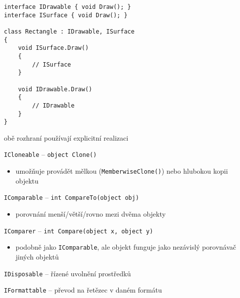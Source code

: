 \begin{frame}[fragile]
\begin{yesblock}
\begin{lstlisting}
interface IDrawable { void Draw(); }
interface ISurface { void Draw(); }

class Rectangle : IDrawable, ISurface
{
    void ISurface.Draw()
    {
        // ISurface
    }

    void IDrawable.Draw()
    {
        // IDrawable
    }
}
\end{lstlisting}
\end{yesblock}
\vfill
\begin{bitemize}{}
\item obě rozhraní používají explicitní realizaci
\end{bitemize}
\end{frame}










\begin{frame}[fragile]
\vfill
\begin{bitemize}{}
\item \lstinline|ICloneable| -- \lstinline|object Clone()|
\begin{itemize}
\item umožňuje provádět mělkou (\lstinline|MemberwiseClone()|) nebo hlubokou kopii objektu
\end{itemize}

\item \lstinline|IComparable| -- \lstinline|int CompareTo(object obj)|
\begin{itemize}
\item porovnání menší/větší/rovno mezi dvěma objekty
\end{itemize}

\item \lstinline|IComparer| -- \lstinline|int Compare(object x, object y)|
\begin{itemize}
\item podobně jako \lstinline|IComparable|, ale objekt funguje jako nezávislý porovnávač jiných objektů
\end{itemize}

\item \lstinline|IDisposable| -- řízené uvolnění prostředků
\item \lstinline|IFormattable| -- převod na řetězec v daném formátu
\end{bitemize}
\vfill
\end{frame}




